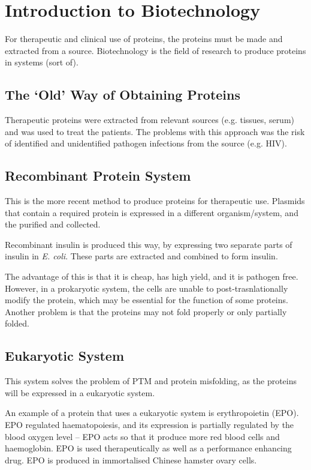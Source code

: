 \section{Introduction to Biotechnology}

For therapeutic and clinical use of proteins, the proteins must be made and extracted from a source.
Biotechnology is the field of research to produce proteins in systems (sort of).

\subsection{The `Old' Way of Obtaining Proteins}

Therapeutic proteins were extracted from relevant sources (e.g. tissues, serum) and was used to treat the patients.
The problems with this approach was the risk of identified and unidentified pathogen infections from the source (e.g. HIV).

\subsection{Recombinant Protein System}

This is the more recent method to produce proteins for therapeutic use.
Plasmids that contain a required protein is expressed in a different organism/system, and the purified and collected.

Recombinant insulin is produced this way, by expressing two separate parts of insulin in \textit{E. coli}.
These parts are extracted and combined to form insulin.

The advantage of this is that it is cheap, has high yield, and it is pathogen free.
However, in a prokaryotic system, the cells are unable to post-trasnlationally modify the protein, which may be essential for the function of some proteins.
Another problem is that the proteins may not fold properly or only partially folded.

\subsection{Eukaryotic System}

This system solves the problem of PTM and protein misfolding, as the proteins will be expressed in a eukaryotic system.

An example of a protein that uses a eukaryotic system is erythropoietin (EPO).
EPO regulated haematopoiesis, and its expression is partially regulated by the blood oxygen level -- EPO acts so that it produce more red blood cells and haemoglobin.
EPO is used therapeutically as well as a performance enhancing drug.
EPO is produced in immortalised Chinese hamster ovary cells.

